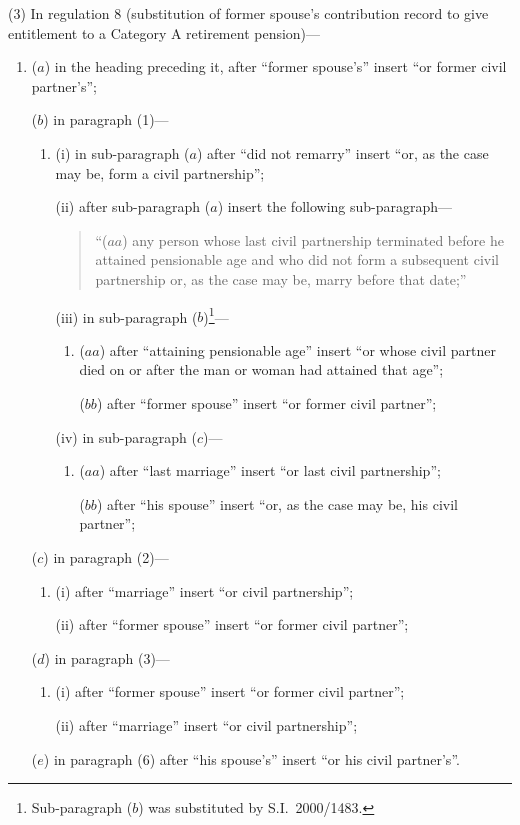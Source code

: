 \documentclass[12pt,a4paper]{article}
\begin{document}
(3) In regulation 8 (substitution of former spouse’s contribution record to give entitlement to a Category A retirement pension)—
\begin{enumerate}\item[]
($a$) in the heading preceding it, after “former spouse's” insert “or former civil partner's”;

($b$) in paragraph (1)—
\begin{enumerate}\item[]
(i) in sub-paragraph ($a$)  after “did not remarry” insert “or, as the case may be, form a civil partnership”;

(ii) after sub-paragraph ($a$)  insert the following sub-paragraph—
\begin{quotation}
“($aa$) any person whose last civil partnership terminated before he attained pensionable age and who did not form a subsequent civil partnership or, as the case may be, marry before that date;”
\end{quotation}

(iii) in sub-paragraph ($b$)\footnote{Sub-paragraph ($b$) was substituted by S.I.\ 2000/1483.}—
\begin{enumerate}\item[]
($aa$) after “attaining pensionable age” insert “or whose civil partner died on or after the man or woman had attained that age”;

($bb$) after “former spouse” insert “or former civil partner”;
\end{enumerate}

(iv) in sub-paragraph ($c$)—
\begin{enumerate}\item[]
($aa$) after “last marriage” insert “or last civil partnership”;

($bb$) after “his spouse” insert “or, as the case may be, his civil partner”;
\end{enumerate}
\end{enumerate}

($c$) in paragraph (2)—
\begin{enumerate}\item[]
(i) after “marriage” insert “or civil partnership”;

(ii) after “former spouse” insert “or former civil partner”;
\end{enumerate}

($d$) in paragraph (3)—
\begin{enumerate}\item[]
(i) after “former spouse” insert “or former civil partner”;

(ii) after “marriage” insert “or civil partnership”;
\end{enumerate}

($e$) in paragraph (6) after “his spouse's” insert “or his civil partner's”.
\end{enumerate}
\end{document}
